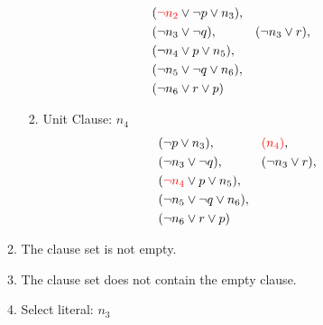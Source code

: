 \documentclass[11pt,a4paper]{article}
\begin{document}
\begin{enumerate}
\begin{enumerate}
\begin{enumerate}
\begin{align*}
& (\textcolor{red}{\neg n_2} \lor \neg p \lor n_3), \\
& (\neg n_3 \lor \neg q) , &&  (\neg n_3 \lor r), \\
& (\neg n_4 \lor p \lor n_5), \\
& (\neg n_5 \lor \neg q \lor n_6), \\
& (\neg n_6 \lor r \lor p)
\end{align*}
\item Unit Clause:  $n_4$
\begin{align*}
& (\neg p \lor n_3), &&  \textcolor{red}{(n_4)},\\
& (\neg n_3 \lor \neg q) , &&  (\neg n_3 \lor r), \\
& (\textcolor{red}{\neg n_4} \lor p \lor n_5), \\
& (\neg n_5 \lor \neg q \lor n_6), \\
& (\neg n_6 \lor r \lor p)
\end{align*}
\end{enumerate}
\item The clause set is not empty.
\item The clause set does not contain the empty clause.
\item Select literal: $n_3$
\end{enumerate}



\end{enumerate}
\end{document}
